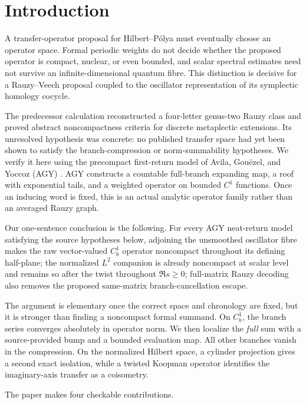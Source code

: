 \section{Introduction}
\label{sec:introduction}

A transfer-operator proposal for Hilbert--P\'olya must eventually choose an
operator space.  Formal periodic weights do not decide whether the proposed
operator is compact, nuclear, or even bounded, and scalar spectral estimates
need not survive an infinite-dimensional quantum fibre.  This distinction is
decisive for a Rauzy--Veech proposal coupled to the oscillator representation
of its symplectic homology cocycle.

The predecessor calculation reconstructed a four-letter genus-two Rauzy
class and proved abstract noncompactness criteria for discrete metaplectic
extensions.  Its unresolved hypothesis was concrete: no published transfer space
had yet been shown to satisfy the branch-compression or norm-summability
hypotheses.  We verify it here using the precompact first-return model
of Avila, Gou\"ezel, and Yoccoz (AGY) \citep{agy2006}.  AGY constructs a
countable full-branch expanding map, a roof with exponential tails, and a
weighted operator on bounded \(C^1\) functions.  Once an inducing word is
fixed, this is an actual analytic operator family rather than an averaged
Rauzy graph.

Our one-sentence conclusion is the following.  For every AGY neat-return
model satisfying the source hypotheses below, adjoining the unsmoothed
oscillator fibre makes the raw vector-valued \(C_b^1\) operator noncompact
throughout its defining half-plane; the normalized \(L^2\) companion is
already noncompact at scalar level and remains so after the twist throughout
\(\Re s\ge0\); full-matrix Rauzy decoding also removes the proposed
same-matrix branch-cancellation escape.

The argument is elementary once the correct space and chronology are fixed,
but it is stronger than finding a noncompact formal summand.  On \(C_b^1\),
the branch series converges absolutely in operator norm.  We then localize
the \emph{full} sum with a source-provided bump and a bounded evaluation map.
All other branches vanish in the compression.  On the normalized Hilbert
space, a cylinder projection gives a second exact isolation, while a twisted
Koopman operator identifies the imaginary-axis transfer as a coisometry.

The paper makes four checkable contributions.

